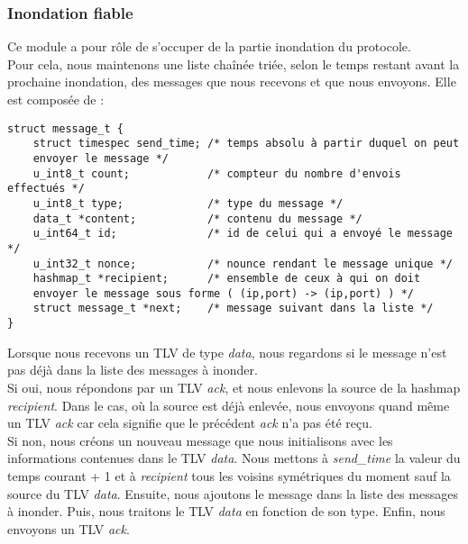 \documentclass{FR16}
\begin{document}
\subsubsection{Inondation fiable}
Ce module a pour rôle de s'occuper de la partie inondation du protocole.\\
Pour cela, nous maintenons une liste chaînée triée, selon le temps restant avant la prochaine inondation, des messages que nous recevons et que nous envoyons. Elle est composée de :
\begin{verbatim}
struct message_t {
    struct timespec send_time; /* temps absolu à partir duquel on peut 
    envoyer le message */
    u_int8_t count;            /* compteur du nombre d'envois effectués */
    u_int8_t type;             /* type du message */
    data_t *content;           /* contenu du message */
    u_int64_t id;              /* id de celui qui a envoyé le message */
    u_int32_t nonce;           /* nounce rendant le message unique */
    hashmap_t *recipient;      /* ensemble de ceux à qui on doit 
    envoyer le message sous forme ( (ip,port) -> (ip,port) ) */
    struct message_t *next;    /* message suivant dans la liste */
}
\end{verbatim}
Lorsque nous recevons un TLV de type \textit{data}, nous regardons si le message n'est pas déjà dans la liste des messages à inonder.\\
Si oui, nous répondons par un TLV \textit{ack}, et nous enlevons la source de la hashmap \textit{recipient}. Dans le cas, où la source est déjà enlevée, nous envoyons quand même un TLV \textit{ack} car cela signifie que le précédent \textit{ack} n'a pas été reçu.\\
Si non, nous créons un nouveau message que nous initialisons avec les informations contenues dans le TLV \textit{data}. Nous mettons à \textit{send\_time} la valeur du temps courant + 1 et à \textit{recipient} tous les voisins symétriques du moment sauf la source du TLV \textit{data}. Ensuite, nous ajoutons le message dans la liste des messages à inonder. Puis, nous traitons le TLV \textit{data} en fonction de son type. Enfin, nous envoyons un TLV \textit{ack}.\\
\end{document}
